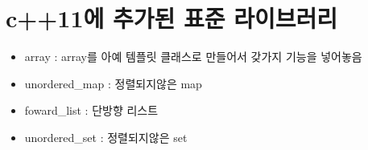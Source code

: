 \documentclass{oblivoir}
\begin{document}
\section{c++11에 추가된 표준 라이브러리}
\begin{itemize}
    \item array : array를 아예 템플릿 클래스로 만들어서 갖가지 기능을 넣어놓음
    \item unordered\_map : 정렬되지않은 map
    \item foward\_list : 단방향 리스트
    \item unordered\_set : 정렬되지않은 set
\end{itemize}
\end{document}
